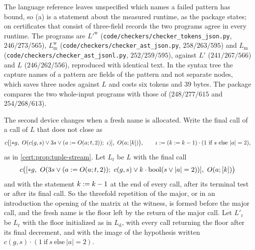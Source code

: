 The language reference leaves unspecified which names a failed pattern has
bound, so (a) is a statement about the measured runtime, as the package states;
on certificates that consist of three-field records the two programs agree in
every runtime. The programs are $L'^{\mathrm w}$
(\texttt{code/checkers/checker\_tokens\_json.py}, $246/273/565$),
$L^{\mathrm w}_{\mathrm m}$ (\texttt{code/checkers/checker\_ast\_json.py},
$258/263/595$) and $L_{\mathrm m}$ (\texttt{code/checkers/checker\_ast\_jsonl.py},
$252/259/595$), against $L'$ ($241/267/566$) and $L$ ($246/262/556$), reproduced
with identical text. In the syntax tree the capture names of a pattern are
fields of the pattern and not separate nodes, which saves three nodes against
$L$ and costs six tokens and $39$ bytes. The package compares the two
whole-input programs with those of  ($248/277/615$
and $254/268/613$).

The second device changes when a fresh name is allocated. Write the final call
of a call of $L$ that does not close as
\[
c\bigl([{*}g,\ O(c(g,s)\lor 3s\lor(a\defeq O(a;t,2));\ \iota)],\ O(a;[k])\bigr),
\qquad \iota\defeq(k\defeq k-1)\cdot(1\ \text{if}\ s\ \text{else}\ \lvert a\rvert=2),
\]
as in \cref{cert:prop:tuple-stream}. Let $L_{\mathrm r}$ be $L$ with the final call
\[
c\bigl([{*}g,\ O(3s\lor(a\defeq O(a;t,2));\ c(g,s)\lor k\cdot\mathrm{bool}(s\lor\lvert a\rvert=2))],\ O(a;[k])\bigr)
\]
and with the statement $k\mathrel{:=} k-1$ at the end of every call, after its
terminal test or after its final call. So the threefold repetition of the major,
or in an introduction the opening of the matrix at the witness, is formed before
the major call, and the fresh name is the floor left by the return of the major
call. Let $L'_{\mathrm r}$ be $L_{\mathrm r}$ with the floor initialized as in
$L_{\mathrm d}$, with every call returning the floor after its final decrement,
and with the image of the hypothesis written $c(g,s)\cdot(1\ \text{if}\ s\
\text{else}\ \lvert a\rvert=2)$.

